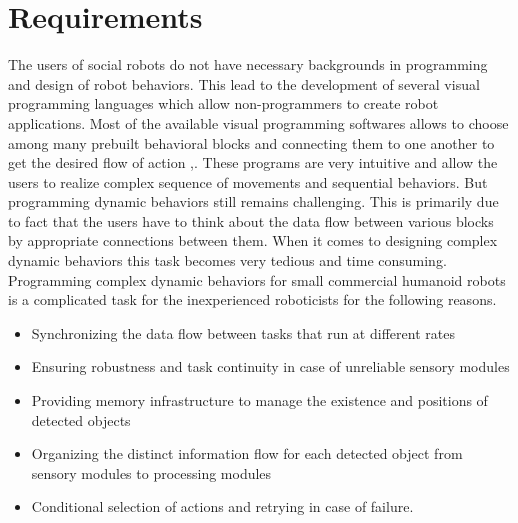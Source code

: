 {\section{Requirements}
The users of social robots do not have necessary backgrounds in programming and design of robot behaviors. This lead to the development of several visual programming languages which allow non-programmers to create robot applications. Most of the available visual programming softwares allows to choose among many prebuilt behavioral blocks and connecting them to one another to get the desired flow of action \cite{MSRS4},\cite{Choregraphe}. These programs are very intuitive and allow the users to realize complex sequence of movements and sequential behaviors. But programming dynamic behaviors still remains challenging. This is primarily due to fact that the users have to think about the data flow between various blocks by appropriate connections between them. When it comes to designing complex dynamic behaviors this task becomes very tedious and time consuming. 
Programming complex dynamic behaviors for small commercial humanoid robots is a complicated task for the inexperienced roboticists\cite{BerenzTDM2014} for the following reasons.
\begin{itemize}
\item Synchronizing the data flow between tasks that run at different rates
\item Ensuring robustness and task continuity in case of unreliable sensory modules
\item Providing memory infrastructure to manage the existence and positions of detected objects
\item Organizing the distinct information flow for each detected object from sensory modules to processing modules
\item Conditional selection of actions and retrying in case of failure. 
\end{itemize}
}

